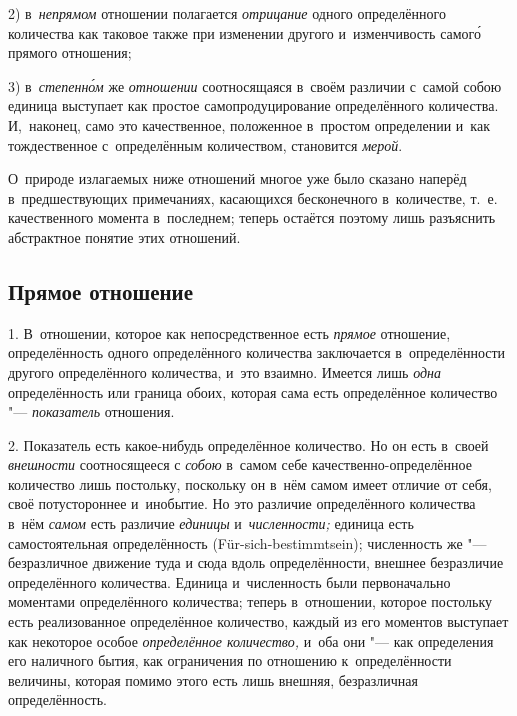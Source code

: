 2) в~{\em непрямом} отношении полагается {\em отрицание} одного определённого
количества как таковое также при изменении другого и~изменчивость самог\'{о}
прямого отношения;

3) в~{\em степенн\'{о}м} же {\em отношении} соотносящаяся в~своём различии
с~самой собою единица выступает как простое самопродуцирование определённого
количества. И,~наконец, само это качественное, положенное в~простом определении
и~как тождественное с~определённым количеством, становится {\em мерой}.

О~природе излагаемых ниже отношений многое уже было сказано наперёд
в~предшествующих примечаниях, касающихся бесконечного в~количестве, т.~е.
качественного момента в~последнем; теперь остаётся поэтому лишь разъяснить
абстрактное понятие этих отношений.

\subsection{Прямое отношение}

1. В~отношении, которое как непосредственное есть {\em прямое} отношение,
определённость одного определённого количества заключается в~определённости
другого определённого количества, и~это взаимно. Имеется лишь {\em одна}
определённость или граница обоих, которая сама есть определённое количество
"--- {\em показатель} отношения.

2. Показатель есть какое-нибудь определённое количество. Но он есть в~своей
{\em внешности} соотносящееся с {\em собою} в~самом себе
качественно-определённое количество лишь постольку, поскольку он в~нём самом
имеет отличие от себя, своё потустороннее и~инобытие. Но это различие
определённого количества в~нём {\em самом} есть различие {\em единицы}
и~{\em численности;} единица есть самостоятельная определённость
(Für-sich-bestimmt\-sein); численность же "--- безразличное движение туда и
сюда вдоль определённости, внешнее безразличие определённого количества.
Единица и~численность были первоначально моментами определённого количества;
теперь в~отношении, которое постольку есть реализованное определённое
количество, каждый из его моментов выступает как некоторое особое
{\em определённое количество,} и~оба они "--- как определения его наличного
бытия, как ограничения по отношению к~определённости величины, которая помимо
этого есть лишь внешняя, безразличная определённость.

